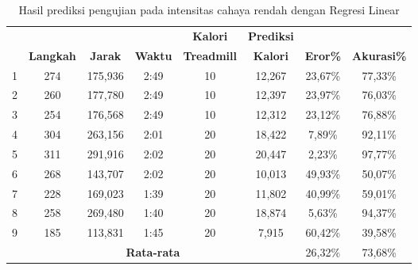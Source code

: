 \begin{longtable}{|c|c|c|c|c|c|c|c|}
  \caption{Hasil prediksi pengujian pada intensitas cahaya rendah dengan Regresi Linear}
  \label{tb:PengujianIntensitasRendahAnalisaPrediksiRegresi}                                   \\
  \hline
  \rowcolor[HTML]{C0C0C0}
  & & & & \textbf{Kalori} & \textbf{Prediksi} & & \\
  \rowcolor[HTML]{C0C0C0}
  \multirow{-2}{*}{\textbf{Percobaan}} & \multirow{-2}{*}{\textbf{Langkah}} & \multirow{-2}{*}{\textbf{Jarak}} & \multirow{-2}{*}{\textbf{Waktu}} & \textbf{Treadmill} & \textbf{Kalori} & \multirow{-2}{*}{\textbf{Eror\%}} & \multirow{-2}{*}{\textbf{Akurasi\%}} \\
  
  \hline
  1   & 274   & 175,936    & 2:49    & 10    & 12,267   & 23,67\%    & 77,33\%   \\
  \hline  
  2   & 260   & 177,780    & 2:49    & 10    & 12,397   & 23,97\%    & 76,03\%  \\
  \hline
  3   & 254   & 176,568    & 2:49    & 10    & 12,312   & 23,12\%    & 76,88\%   \\
  \hline
  4   & 304   & 263,156    & 2:01    & 20    & 18,422   & 7,89\%     & 92,11\%  \\
  \hline
  5   & 311   & 291,916    & 2:02    & 20    & 20,447   & 2,23\%     & 97,77\%    \\
  \hline
  6   & 268   & 143,707    & 2:02    & 20    & 10,013   & 49,93\%    & 50,07\%   \\
  \hline
  7   & 228   & 169,023    & 1:39    & 20    & 11,802   & 40,99\%    & 59,01\%   \\
  \hline
  8   & 258   & 269,480    & 1:40    & 20    & 18,874   & 5,63\%     & 94,37\%   \\
  \hline
  9   & 185   & 113,831    & 1:45    & 20    & 7,915    & 60,42\%    & 39,58\%   \\
  \hline

  \multicolumn{6}{|c|}{\textbf{Rata-rata}} & 26,32\% & 73,68\% \\
  \hline
\end{longtable}

